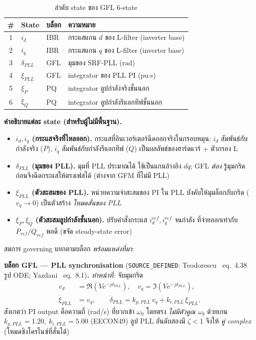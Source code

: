 \documentclass[12pt,a4paper]{article}
\begin{document}
\begin{table}[H]\centering\small
\caption{ลำดับ state ของ GFL 6-state}
\label{tab:order-gfl}
\begin{tabular}{clll}\toprule
\# & State & บล็อก & ความหมาย\\\midrule
1 & $i_d$        & IBR & กระแสแกน $d$ ของ L-filter (inverter base)\\
2 & $i_q$        & IBR & กระแสแกน $q$ ของ L-filter (inverter base)\\
3 & $\delta_{PLL}$ & GFL & มุมของ SRF-PLL (rad)\\
4 & $\xi_{PLL}$  & GFL & integrator ของ PLL PI (pu$\cdot$s)\\
5 & $\xi_{P}$    & PQ  & integrator ลูปกำลังจริงชั้นนอก\\
6 & $\xi_{Q}$    & PQ  & integrator ลูปกำลังรีแอกทีฟชั้นนอก\\\bottomrule
\end{tabular}\end{table}

\noindent\textbf{คำอธิบายแต่ละ state (สำหรับผู้ไม่มีพื้นฐาน).}
\begin{itemize}
  \item \textbf{$i_d,i_q$ (กระแสจริงที่ไหลออก).} กระแสที่อินเวอร์เตอร์ฉีดออกจริงในกรอบหมุน: $i_d$ สัมพันธ์กับ
  กำลังจริง ($P$), $i_q$ สัมพันธ์กับกำลังรีแอกทีฟ ($Q$) เป็นผลลัพธ์ของฮาร์ดแวร์ + ตัวกรอง L
  \item \textbf{$\delta_{PLL}$ (มุมของ PLL).} มุมที่ PLL ประมาณได้ ใช้เป็นแกนอ้างอิง $dq$; GFL \emph{ต้อง}
  รู้มุมกริดก่อนจึงฉีดกระแสให้ตรงเฟสได้ (ต่างจาก GFM ที่ไม่มี PLL)
  \item \textbf{$\xi_{PLL}$ (ตัวสะสมของ PLL).} หน่วยความจำสะสมของ PI ใน PLL บังคับให้มุมล็อกกับกริด
  ($v_q\to0$) เป็นตัวสร้าง \emph{โหมดสั่นของ PLL}
  \item \textbf{$\xi_{P},\xi_{Q}$ (ตัวสะสมลูปกำลังชั้นนอก).} ปรับคำสั่งกระแส $i_d^{ref},i_q^{ref}$ จนกำลัง
  ที่จ่ายออกเท่ากับ $P_{ref}/Q_{ref}$ พอดี (ขจัด steady-state error)
\end{itemize}

\noindent สมการ governing แยกตามบล็อก \emph{พร้อมแหล่งที่มา}:

\noindent\textbf{บล็อก GFL --- PLL synchronisation} (\texttt{SOURCE\_DEFINED}: Teodorescu~\cite{teodorescu2011}
eq.~4.38 รูป ODE; Yazdani~\cite{yazdani2010} eq.~8.1)\textbf{.} \emph{ทำหน้าที่:} จับมุมกริด
\begin{align}
v_d &= \Re(Ve^{-j\delta_{PLL}}),\quad v_q = \Im(Ve^{-j\delta_{PLL}}),\\
\dot\xi_{PLL} &= v_q,\qquad
\dot\delta_{PLL} = k_{p,PLL}\,v_q + k_{i,PLL}\,\xi_{PLL}.
\label{eq:gfl-pll}
\end{align}
สังเกตว่า PI output คือความถี่ (rad/s) ที่บวกเข้า $\omega_0$ โดยตรง \emph{ไม่มีตัวคูณ $\omega_b$} ด้วยเกน
$k_{p,PLL}=1.20,\ k_{i,PLL}=5.00$ (EECON49) ลูป PLL อันดับสองมี $\zeta<1$ จึงให้ \emph{คู่ complex}
(โหมดซิงโครไนซ์ที่สั่นได้)
\end{document}
